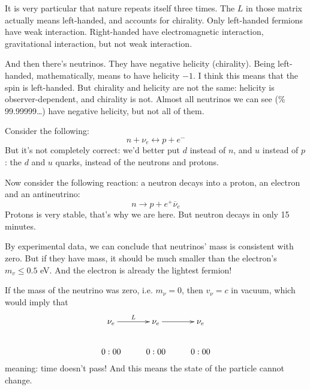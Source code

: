 It is very particular that nature repeats
itself three times. The $L$ in those
matrix actually means left-handed, and
accounts for chirality. Only left-handed
fermions have weak interaction. Right-handed
have electromagnetic interaction,
gravitational interaction, but not weak
interaction.

And then there's neutrinos. They have
negative helicity (chirality). Being
left-handed, mathematically, means to have
helicity $-1$. I think this means
that the spin is left-handed. But chirality
and helicity are not the same:
helicity is observer-dependent, and chirality
is not. Almost all neutrinos we
can see (\% 99.99999…) have negative
helicity, but not all of them.

Consider the following:
$$
n+\nu_e\leftrightarrow p+e^-
$$
But it's not completely correct: we'd better
put $d$ instead of $n$, and $u$
instead of $p$: the $d$ and $u$ quarks,
instead of the neutrons and protons.

Now consider the following reaction: a
neutron decays into a proton, an electron
and an antineutrino:
$$
n\to p+e^+\overline{\nu}_e
$$
Protons is very stable, that's why we are
here. But neutron decays in only 15
minutes.

By experimental data, we can conclude that
neutrinos' mass is consistent with
zero. But if they have mass, it should be
much smaller than the electron's $m_v
\leq 0.5$ eV. And the electron is already the
lightest fermion!

If the mass of the neutrino was zero, i.e.
$m_\nu=0$, then $v_\nu=c$ in vacuum,
which would imply that
$$
\xymatrix{
\nu_e\ar[r]^{L}&\nu_e\ar[r]&\nu_e\\
0:00&0:00&0:00
}
$$
meaning: time doesn't pass! And this means
the state of the particle cannot
change.





